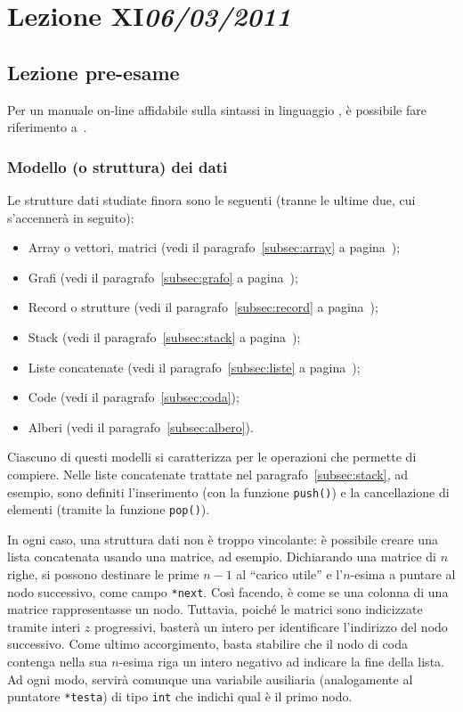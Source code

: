 \chapter[Lezione XI]{Lezione XI\newline\small{\emph{06/03/2011}}}

	\section{Lezione pre-esame}

Per un manuale on-line affidabile sulla sintassi in linguaggio , è possibile fare riferimento a~\cite{wiki:en}. %

		\subsection{Modello (o struttura) dei dati}
Le strutture dati studiate finora sono le seguenti (tranne le ultime due, cui s'accennerà in seguito):
\begin{itemize}[noitemsep]
	\item
Array o vettori, matrici (vedi il paragrafo~\ref{subsec:array} a pagina~\pageref{subsec:array});
	\item
Grafi (vedi il paragrafo~\ref{subsec:grafo} a pagina~\pageref{sucsec:grafo});
	\item
Record o strutture (vedi il paragrafo~\ref{subsec:record} a pagina~\pageref{subsec:record});
	\item
Stack (vedi il paragrafo~\ref{subsec:stack} a pagina~\pageref{subsec:stack});
	\item
Liste concatenate (vedi il paragrafo~\ref{subsec:liste} a pagina~\pageref{subsec:liste});
	\item
Code (vedi il paragrafo~\ref{subsec:coda});
	\item
Alberi (vedi il paragrafo~\ref{subsec:albero}).
\end{itemize}
Ciascuno di questi modelli si caratterizza per le operazioni che permette di compiere.
Nelle liste concatenate trattate nel  paragrafo~\ref{subsec:stack}, ad esempio, sono definiti l'inserimento (con la funzione \lstinline!push()!) e la cancellazione di elementi (tramite la funzione \lstinline!pop()!).


In ogni caso, una struttura dati non è troppo vincolante: è possibile creare una lista concatenata usando una matrice, ad esempio.
Dichiarando una matrice di $n$ righe, si possono destinare le prime $n-1$ al ``carico utile'' e l'$n$-esima a puntare al nodo successivo, come campo \lstinline!*next!.
Così facendo, è come se una colonna di una matrice rappresentasse un nodo.
Tuttavia, poiché le matrici sono indicizzate tramite interi $z$ progressivi, basterà un intero per identificare l'indirizzo del nodo successivo.
Come ultimo accorgimento, basta stabilire che il nodo di coda contenga nella sua $n$-esima riga un intero negativo ad indicare la fine della lista.
Ad ogni modo, servirà comunque una variabile ausiliaria (analogamente al puntatore \lstinline!*testa!) di tipo \lstinline!int! che indichi qual è il primo nodo.


